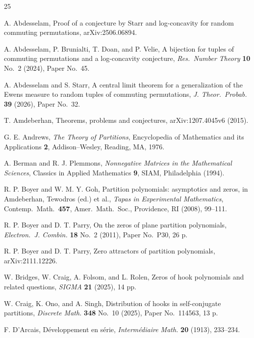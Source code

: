 \documentclass[11pt,reqno]{amsart}
\theoremstyle{plain}
\theoremstyle{remark}
\theoremstyle{definition}
\numberwithin{equation}{section}
\begin{document}
\begin{thebibliography}{25}

A. Abdesselam,
Proof of a conjecture by Starr and log-concavity for random commuting permutations,
arXiv:2506.06894.

A. Abdesselam, P. Brunialti, T. Doan, and P. Velie,
A bijection for tuples of commuting permutations and a log-concavity conjecture,
\emph{Res.\ Number Theory\/} \textbf{10} No.\ 2 (2024),
Paper No.\ 45.

A. Abdesselam and S. Starr,
A central limit theorem for a generalization of the Ewens measure to random tuples of commuting permutations,
\emph{J. Theor.\ Probab.\/} \textbf{39} (2026), Paper No.\ 32.

T. Amdeberhan,
Theorems, problems and conjectures,
arXiv:1207.4045v6 (2015).



G. E. Andrews, \emph{The Theory of Partitions}, Encyclopedia of Mathematics and its Applications %
\textbf{2}, Addison--Wesley, Reading, MA, 1976.






A. Berman and R. J. Plemmons,
\emph{Nonnegative Matrices in the Mathematical Sciences\/},
Classics in Applied Mathematics
\textbf{9}, SIAM, Philadelphia
(1994).

R. P. Boyer and W. M. Y. Goh,
Partition polynomials: asymptotics and zeros,
in Amdeberhan, Tewodros (ed.) et al.,
\emph{Tapas in Experimental Mathematics\/},
Contemp.\ Math.\ \textbf{457}, Amer.\ Math.\ Soc., Providence, RI
(2008), 99--111.

R. P. Boyer and D. T. Parry,
On the zeros of plane partition polynomials,
\emph{Electron.\ J. Combin.\/} \textbf{18} No.\ 2 (2011),
Paper No.\ P30, 26 p.

R. P. Boyer and D. T. Parry,
Zero attractors of partition polynomials,
arXiv:2111.12226.

W. Bridges, W. Craig, A. Folsom, and L. Rolen,
Zeros of hook polynomials and related questions,
\emph{SIGMA\/} \textbf{21} (2025), 14 pp.

W. Craig, K. Ono, and A. Singh,
Distribution of hooks in self-conjugate partitions,
\emph{Discrete Math.\/} \textbf{348} No.~10 (2025), Paper No.\
114563, 13 p.

 F. D'Arcais,
{D\'{e}veloppement en s\'{e}rie}, \emph{Interm\'{e}diaire Math.\/}
\textbf{20} (1913), 233--234.


\end{thebibliography}
\end{document}
